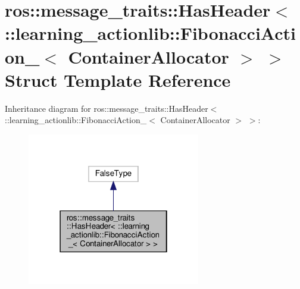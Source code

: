 \hypertarget{structros_1_1message__traits_1_1HasHeader_3_01_1_1learning__actionlib_1_1FibonacciAction___3_01ContainerAllocator_01_4_01_4}{}\section{ros\+:\+:message\+\_\+traits\+:\+:Has\+Header$<$ \+:\+:learning\+\_\+actionlib\+:\+:Fibonacci\+Action\+\_\+$<$ Container\+Allocator $>$ $>$ Struct Template Reference}
\label{structros_1_1message__traits_1_1HasHeader_3_01_1_1learning__actionlib_1_1FibonacciAction___3_01ContainerAllocator_01_4_01_4}


Inheritance diagram for ros\+:\+:message\+\_\+traits\+:\+:Has\+Header$<$ \+:\+:learning\+\_\+actionlib\+:\+:Fibonacci\+Action\+\_\+$<$ Container\+Allocator $>$ $>$\+:
\nopagebreak
\begin{figure}[H]
\begin{center}
\leavevmode
\includegraphics[width=214pt]{structros_1_1message__traits_1_1HasHeader_3_01_1_1learning__actionlib_1_1FibonacciAction___3_01Cc6741040a0a0d245fb5c9e2612b26c17}
\end{center}
\end{figure}


